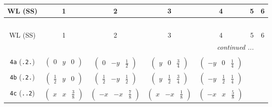 \documentclass[fleqn,9pt,landscape]{jsarticle}
\begin{document}
\begin{center}
\renewcommand{\arraystretch}{1.2}
\begin{longtable}{ccccccc}
 \hline \hline
WL (SS) & 1 & 2 & 3 & 4 & 5 & 6 \\ \hline \endfirsthead

\multicolumn{6}{l}{\tablename\ \thetable{}} \\
 \hline \hline
WL (SS) & 1 & 2 & 3 & 4 & 5 & 6 \\ \hline \endhead

 \hline \hline
\multicolumn{6}{r}{\footnotesize\it continued ...} \\ \endfoot

 \hline \hline
\multicolumn{6}{r}{} \\ \endlastfoot

{\tt 4a} ({\tt .2.}) & $ \begin{pmatrix} 0 & y & 0 \end{pmatrix} $ & $ \begin{pmatrix} 0 & - y & \frac{1}{2} \end{pmatrix} $ & $ \begin{pmatrix} y & 0 & \frac{3}{4} \end{pmatrix} $ & $ \begin{pmatrix} - y & 0 & \frac{1}{4} \end{pmatrix} $ & $  $ & $  $ \\ \hline
{\tt 4b} ({\tt .2.}) & $ \begin{pmatrix} \frac{1}{2} & y & 0 \end{pmatrix} $ & $ \begin{pmatrix} \frac{1}{2} & - y & \frac{1}{2} \end{pmatrix} $ & $ \begin{pmatrix} y & \frac{1}{2} & \frac{3}{4} \end{pmatrix} $ & $ \begin{pmatrix} - y & \frac{1}{2} & \frac{1}{4} \end{pmatrix} $ & $  $ & $  $ \\ \hline
{\tt 4c} ({\tt ..2}) & $ \begin{pmatrix} x & x & \frac{3}{8} \end{pmatrix} $ & $ \begin{pmatrix} - x & - x & \frac{7}{8} \end{pmatrix} $ & $ \begin{pmatrix} x & - x & \frac{1}{8} \end{pmatrix} $ & $ \begin{pmatrix} - x & x & \frac{5}{8} \end{pmatrix} $ & $  $ & $  $ \\ \hline

\end{longtable}
\end{center}
\end{document}
